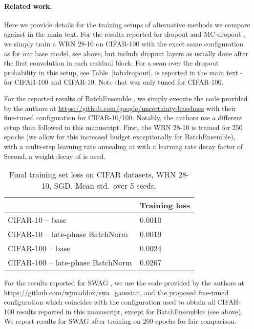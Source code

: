 \documentclass{article} \usepackage{iclr2021_conference,times}
\begin{document}
\paragraph{Related work.} Here we provide details for the training setups of alternative methods we compare against in the main text. For the results reported for dropout \citep{srivastava_dropout_2014} and MC-dropout \citep{gal_dropout_2016}, we simply train a WRN 28-10 on CIFAR-100 with the exact same configuration as for our base model, see above, but include dropout layers as usually done \citep{zagoruyko_wide_2016} after the first convolution in each residual block.
For a scan over the dropout probability  in this setup, see Table~\ref{tab:dropout}.  is reported in the main text - for CIFAR-100 and CIFAR-10. Note that  was only tuned for CIFAR-100. 

For the reported results of BatchEnsemble \citep{wen_batchensemble_2020}, we simply execute the code provided by the authors at \url{https://github.com/google/uncertainty-baselines} with their fine-tuned configuration for CIFAR-10/100.
Notably, the authors use a different setup than followed in this manuscript. First, the WRN 28-10 is trained for 250 epochs (we allow for this increased budget exceptionally for BatchEnsemble), with a multi-step learning rate annealing at  with a learning rate decay factor of . Second, a weight decay of  is used.

\begin{table}
\centering
\caption{Final training set loss on CIFAR datasets, WRN 28-10, SGD.  Mean  std.~over 5 seeds.\label{tab:training-loss}}
\begin{tabular}{ll}
\toprule
    & Training loss \\\midrule
CIFAR-10 -- base &  0.0010     \\
CIFAR-10 -- late-phase BatchNorm  & 0.0019  \\\midrule  
CIFAR-100 -- base &  0.0024     \\
CIFAR-100 -- late-phase BatchNorm  & 0.0267  \\\bottomrule  
\end{tabular}
\end{table}

For the results reported for SWAG \citep{maddox_simple_2019}, we use the code provided by the authors at \url{https://github.com/wjmaddox/swa_gaussian}, and the proposed fine-tuned configuration which coincides with the configuration used to
obtain all CIFAR-100 results reported in this manuscript, except for BatchEnsembles (see above). We report results for SWAG after training on 200 epochs for fair comparison.
\end{document}
